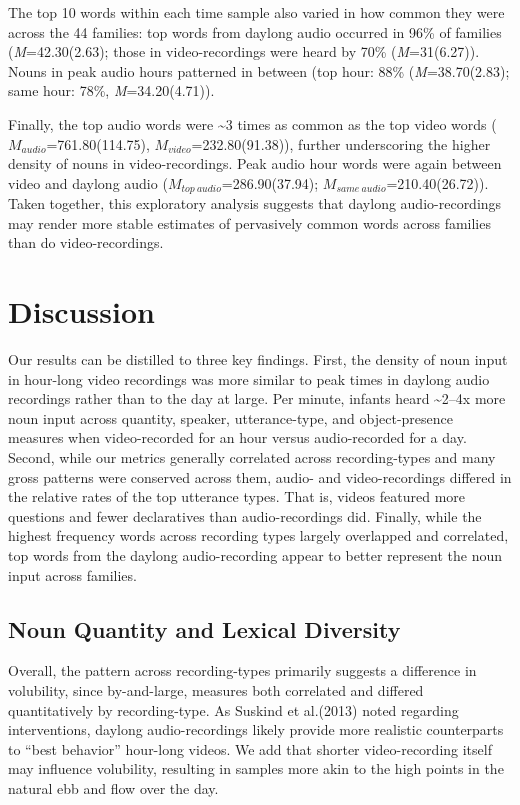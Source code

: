 \documentclass[man]{apa6}
\theoremstyle{definition}
\theoremstyle{definition}
\theoremstyle{definition}
\theoremstyle{remark}
\begin{document}
The top 10 words within each time sample also varied in how common they
were across the 44 families: top words from daylong audio occurred in
96\% of families (\emph{M}=42.30(2.63); those in video-recordings were
heard by 70\% (\emph{M}=31(6.27)). Nouns in peak audio hours patterned
in between (top hour: 88\% (\emph{M}=38.70(2.83); same hour: 78\%,
\emph{M}=34.20(4.71)).

Finally, the top audio words were \textasciitilde{}3 times as common as
the top video words (\(M_{audio}\)=761.80(114.75),
\(M_{video}\)=232.80(91.38)), further underscoring the higher density of
nouns in video-recordings. Peak audio hour words were again between
video and daylong audio (\(M_{top\ audio}\)=286.90(37.94);
\(M_{same\ audio}\)=210.40(26.72)). Taken together, this exploratory
analysis suggests that daylong audio-recordings may render more stable
estimates of pervasively common words across families than do
video-recordings.

\section{Discussion}\label{discussion}

Our results can be distilled to three key findings. First, the density
of noun input in hour-long video recordings was more similar to peak
times in daylong audio recordings rather than to the day at large. Per
minute, infants heard \textasciitilde{}2--4x more noun input across
quantity, speaker, utterance-type, and object-presence measures when
video-recorded for an hour versus audio-recorded for a day. Second,
while our metrics generally correlated across recording-types and many
gross patterns were conserved across them, audio- and video-recordings
differed in the relative rates of the top utterance types. That is,
videos featured more questions and fewer declaratives than
audio-recordings did. Finally, while the highest frequency words across
recording types largely overlapped and correlated, top words from the
daylong audio-recording appear to better represent the noun input across
families.

\subsection{Noun Quantity and Lexical
Diversity}\label{noun-quantity-and-lexical-diversity}

Overall, the pattern across recording-types primarily suggests a
difference in volubility, since by-and-large, measures both correlated
and differed quantitatively by recording-type. As Suskind et al.(2013)
noted regarding interventions, daylong audio-recordings likely provide
more realistic counterparts to \enquote{best behavior} hour-long videos.
We add that shorter video-recording itself may influence volubility,
resulting in samples more akin to the high points in the natural ebb and
flow over the day.
\end{document}
